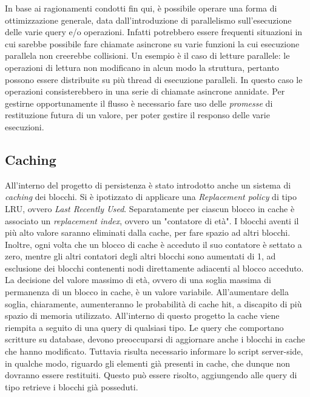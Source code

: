 
		In base ai ragionamenti condotti fin qui, è possibile operare una forma di ottimizzazione generale, data dall'introduzione di parallelismo sull'esecuzione delle varie query e/o operazioni. Infatti potrebbero essere frequenti situazioni in cui sarebbe possibile fare chiamate asincrone su varie funzioni la cui esecuzione parallela non creerebbe collisioni. Un esempio è il caso di letture parallele: le operazioni di lettura non modificano in alcun modo la struttura, pertanto possono essere distribuite su più thread di esecuzione paralleli. In questo caso le operazioni consisterebbero in una serie di chiamate asincrone annidate. Per gestirne opportunamente il flusso è necessario fare uso delle \textit{promesse} di restituzione futura di un valore, per poter gestire il responso delle varie esecuzioni.
		
	\subsection{Caching}
	


		All'interno del progetto di persistenza è stato introdotto anche un sistema di \textit{caching} dei blocchi. Si è ipotizzato di applicare una \textit{Replacement policy} di tipo LRU, ovvero \textit{Last Recently Used}. Separatamente per ciascun blocco in cache è associato un \textit{replacement index}, ovvero un "contatore di età". I blocchi aventi il più alto valore saranno eliminati dalla cache, per fare spazio ad altri blocchi. Inoltre, ogni volta che un blocco di cache è acceduto il suo contatore è settato a zero, mentre gli altri contatori degli altri blocchi sono aumentati di 1, ad esclusione dei blocchi contenenti nodi direttamente adiacenti al blocco acceduto. La decisione del valore massimo di età, ovvero di una soglia massima di permanenza di un blocco in cache, è un valore variabile. All'aumentare della soglia, chiaramente, aumenteranno le probabilità di cache hit, a discapito di più spazio di memoria utilizzato.
		All'interno di questo progetto la cache viene riempita a seguito di una query di qualsiasi tipo. Le query che comportano scritture su database, devono preoccuparsi di aggiornare anche i blocchi in cache che hanno modificato.
		Tuttavia risulta necessario informare lo script server-side, in qualche modo, riguardo gli elementi già presenti in cache, che dunque non dovranno essere restituiti. Questo può essere risolto, aggiungendo alle query di tipo retrieve i blocchi già posseduti.
		

